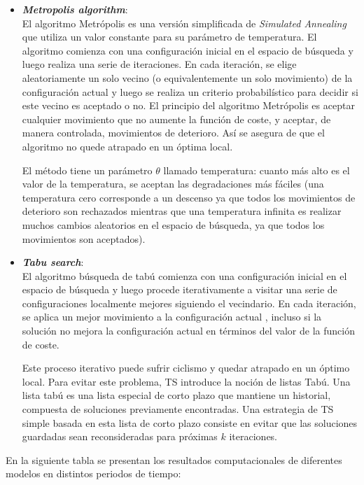 \documentclass[letter, 10pt]{article}
\begin{document}
\begin{itemize}
 \item \textbf{\textit{Metropolis algorithm}}: \\
 El algoritmo Metrópolis es una versión simplificada de \textit{Simulated Annealing} que utiliza un valor constante para su parámetro de temperatura. El algoritmo comienza con una configuración inicial en el espacio de búsqueda y luego realiza una serie de iteraciones. En cada iteración, se elige aleatoriamente un solo vecino (o equivalentemente un solo movimiento) de la configuración actual y luego se realiza un criterio probabilístico para decidir si este vecino es aceptado o no. El principio del algoritmo Metrópolis es aceptar cualquier movimiento que no aumente la función de coste, y aceptar, de manera controlada, movimientos de deterioro. Así se asegura de que el algoritmo no quede atrapado en un óptima local.
 
El método tiene un parámetro $\theta$ llamado temperatura: cuanto más alto es el valor de la temperatura, se aceptan las degradaciones más fáciles (una temperatura cero corresponde a un descenso ya que todos los movimientos de deterioro son rechazados mientras que una temperatura infinita es realizar muchos cambios aleatorios en el espacio de búsqueda, ya que todos los movimientos son aceptados).

\item \textbf{\textit{Tabu search}}: \\
El algoritmo búsqueda de tabú comienza con una configuración inicial en el espacio de búsqueda y luego procede iterativamente a visitar una serie de configuraciones localmente mejores siguiendo el vecindario. En cada iteración, se aplica un mejor movimiento a la configuración actual , incluso si la solución no mejora la configuración actual en términos del valor de la función de coste. 

Este proceso iterativo puede sufrir ciclismo y quedar atrapado en un óptimo local. Para evitar este problema, TS introduce la noción de listas Tabú. Una lista tabú es una lista especial de corto plazo que mantiene un historial, compuesta de soluciones previamente encontradas. Una estrategia de TS simple basada en esta lista de corto plazo consiste en evitar que las soluciones guardadas sean reconsideradas para próximas $k$ iteraciones. \end{itemize}

En la siguiente tabla se presentan los resultados computacionales de diferentes modelos en distintos periodos de tiempo:
\end{document}
